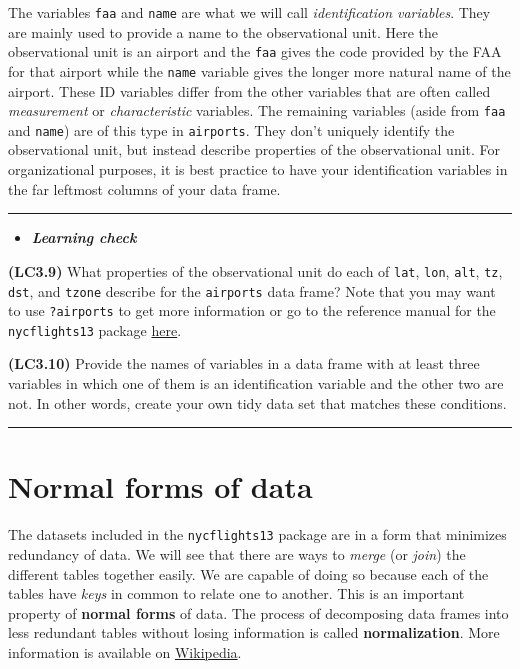 \documentclass[]{tufte-book}
\let\oldrule=\rule
\renewcommand{\rule}[1]{\oldrule{\linewidth}}
\newenvironment{rmdblock}[1]
  {\begin{shaded*}
  \begin{itemize}
  \renewcommand{\labelitemi}{
    \raisebox{-.7\height}[0pt][0pt]{
    }
  }
  \item
  }
  {
  \end{itemize}
  \end{shaded*}
  }
\newenvironment{learncheck}
  {\begin{rmdblock}{warning}}
  {\end{rmdblock}}
\begin{document}
The variables \texttt{faa} and \texttt{name} are what we will call
\emph{identification variables}. They are mainly used to provide a name
to the observational unit. Here the observational unit is an airport and
the \texttt{faa} gives the code provided by the FAA for that airport
while the \texttt{name} variable gives the longer more natural name of
the airport. These ID variables differ from the other variables that are
often called \emph{measurement} or \emph{characteristic} variables. The
remaining variables (aside from \texttt{faa} and \texttt{name}) are of
this type in \texttt{airports}. They don't uniquely identify the
observational unit, but instead describe properties of the observational
unit. For organizational purposes, it is best practice to have your
identification variables in the far leftmost columns of your data frame.

\begin{center}\rule{0.5\linewidth}{\linethickness}\end{center}

\begin{learncheck}
\textbf{\emph{Learning check}}
\end{learncheck}

\textbf{(LC3.9)} What properties of the observational unit do each of
\texttt{lat}, \texttt{lon}, \texttt{alt}, \texttt{tz}, \texttt{dst}, and
\texttt{tzone} describe for the \texttt{airports} data frame? Note that
you may want to use \texttt{?airports} to get more information or go to
the reference manual for the \texttt{nycflights13} package
\href{https://cran.r-project.org/web/packages/nycflights13/nycflights13.pdf}{here}.

\textbf{(LC3.10)} Provide the names of variables in a data frame with at
least three variables in which one of them is an identification variable
and the other two are not. In other words, create your own tidy data set
that matches these conditions.

\begin{center}\rule{0.5\linewidth}{\linethickness}\end{center}

\section{Normal forms of data}\label{normal-forms-of-data}

The datasets included in the \texttt{nycflights13} package are in a form
that minimizes redundancy of data. We will see that there are ways to
\emph{merge} (or \emph{join}) the different tables together easily. We
are capable of doing so because each of the tables have \emph{keys} in
common to relate one to another. This is an important property of
\textbf{normal forms} of data. The process of decomposing data frames
into less redundant tables without losing information is called
\textbf{normalization}. More information is available on
\href{https://en.wikipedia.org/wiki/Database_normalization}{Wikipedia}.
\end{document}
